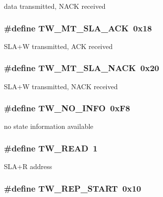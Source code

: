 \label{group__util__twi_ga91c107a74d268f8578d866ed1bbbd4f3}
data transmitted, NACK received \hypertarget{group__util__twi_ga85cae14b4190042335d25ed9a1b72369}{
\subsubsection[{TW\_\-MT\_\-SLA\_\-ACK}]{\setlength{\rightskip}{0pt plus 5cm}\#define TW\_\-MT\_\-SLA\_\-ACK~0x18}}
\label{group__util__twi_ga85cae14b4190042335d25ed9a1b72369}
SLA+W transmitted, ACK received \hypertarget{group__util__twi_gaca64b973c51d6548a962c1d7cae0663e}{
\subsubsection[{TW\_\-MT\_\-SLA\_\-NACK}]{\setlength{\rightskip}{0pt plus 5cm}\#define TW\_\-MT\_\-SLA\_\-NACK~0x20}}
\label{group__util__twi_gaca64b973c51d6548a962c1d7cae0663e}
SLA+W transmitted, NACK received \hypertarget{group__util__twi_gabcff70642634cb53e9d8e93872f70c90}{
\subsubsection[{TW\_\-NO\_\-INFO}]{\setlength{\rightskip}{0pt plus 5cm}\#define TW\_\-NO\_\-INFO~0xF8}}
\label{group__util__twi_gabcff70642634cb53e9d8e93872f70c90}
no state information available \hypertarget{group__util__twi_gaf40f13cadca25e0a83dc096858907819}{
\subsubsection[{TW\_\-READ}]{\setlength{\rightskip}{0pt plus 5cm}\#define TW\_\-READ~1}}
\label{group__util__twi_gaf40f13cadca25e0a83dc096858907819}
SLA+R address \hypertarget{group__util__twi_ga8dce3e4b7e35355a8add9ed63d1fa3ab}{
\subsubsection[{TW\_\-REP\_\-START}]{\setlength{\rightskip}{0pt plus 5cm}\#define TW\_\-REP\_\-START~0x10}}
